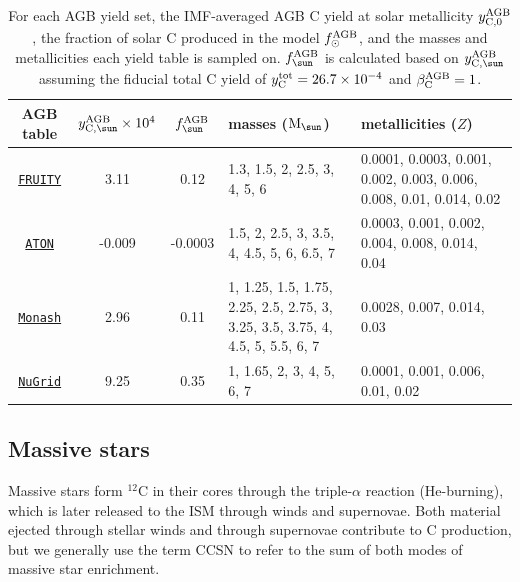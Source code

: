 \documentclass[fleqn,
usenatbib]{mnras}
\newcommand{\fruity}{\texttt{\hyperlink{fruity}{FRUITY}}}
\newcommand{\nugrid}{\texttt{\hyperlink{nugrid}{NuGrid}}}
\newcommand{\monash}{\texttt{\hyperlink{monash}{Monash}}}
\newcommand{\aton}{\texttt{\hyperlink{aton}{ATON}}}
\newcommand{\Yct}{{y_{\rm C}^{\rm  tot}}}
\newcommand{\aagb}{\beta_{\rm C}^{\rm AGB}}
\newcommand{\Mo}{ {\rm M}_{\sun}}
\begin{document}
\begin{table}
	\centering
    \caption[]{For each AGB yield set, the IMF-averaged AGB C yield at solar metallicity $y_{\rm C, 0}^{\rm AGB}$, the fraction of solar C produced in the model $f_\odot^{\rm AGB}$, and the masses and metallicities each yield table is sampled on.
    $f_{\sun}^{\rm AGB}$ is calculated based on $y_{\rm C, \sun}^{\rm AGB}$ assuming the fiducial total C yield of $\Yct = 26.7\times 10^{-4}$ and $\aagb=1$.
    }

	\label{tab:agb}
    \begin{tabular}{c  c  c p{4cm} p{4cm}} %
		\hline 
        AGB table 
                & $y_{\rm C, \sun}^{\rm AGB}\times10^4$ %
                &  $f_{\sun}^{\rm AGB}$
                & masses ($\Mo$) & metallicities ($Z$)\\
        \hline
        \fruity 
                & 3.11
                & 0.12
                & 1.3, 1.5, 2, 2.5, 3, 4, 5, 6
                & 0.0001, 0.0003, 0.001, 0.002, 0.003, 0.006, 0.008, 0.01, 0.014, 0.02
                \\
        \aton 
                & -0.009
                & -0.0003
                & 1.5, 2, 2.5, 3, 3.5, 4, 4.5, 5, 6, 6.5, 7
                & 0.0003, 0.001, 0.002, 0.004, 0.008, 0.014, 0.04
                \\
        \monash 
                &  2.96
                & 0.11& 1, 1.25, 1.5, 1.75, 2.25, 2.5, 2.75, 3, 3.25, 3.5, 3.75, 4, 4.5, 5, 5.5, 6, 7 
                & 0.0028, 0.007, 0.014, 0.03
                \\
        \nugrid 
                & 9.25
                &  0.35
                & 1, 1.65, 2, 3, 4, 5, 6, 7
                &  0.0001, 0.001, 0.006, 0.01, 0.02
                \\
		\hline
	\end{tabular}
\end{table}




\subsection{Massive stars}


Massive stars form $^{12}$C in their cores through the triple-$\alpha$ reaction (He-burning), which is later released to the ISM through winds and supernovae. Both material ejected through stellar winds and through supernovae contribute to C production, but we generally use the term CCSN to refer to the sum of both modes of massive star enrichment.
\end{document}
